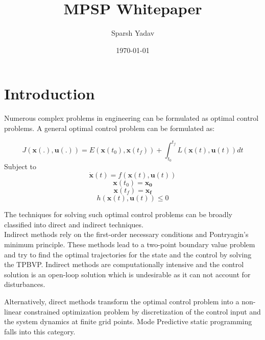 \documentclass[12pt]{article}
\title{MPSP Whitepaper}
\author{Sparsh Yadav}
\date{\today}
\begin{document}
\maketitle{}

\tableofcontents

\clearpage
\newpage

\section{Introduction}

Numerous complex problems in engineering can be formulated as optimal control problems. A general optimal control problem can be formulated as:

\begin{equation}
J(\mathbf{x}(.), \mathbf{u}(.))=E\left(\mathbf{x}\left(t_{0}\right), \mathbf{x}\left(t_{f}\right)\right)+\int_{t_{0}}^{t_{f}} L(\mathbf{x}(t), \mathbf{u}(t)) d t
\end{equation}
Subject to 
\begin{equation}
\dot{\mathbf{x}}(t)=f(\mathbf{x}(t), \mathbf{u}(t))
\end{equation}
\begin{equation}
\mathbf{x}\left(t_{0}\right)= \mathbf{x_0} 
\end{equation}
\begin{equation}
\mathbf{x}\left(t_{f}\right)= \mathbf{x_f} 
\end{equation}
\begin{equation}
h(\mathbf{x}(t), \mathbf{u}(t)) \leq 0
\end{equation}

The techniques for solving such optimal control problems can be broadly classified into direct and indirect techniques.\\

Indirect methods rely on the first-order necessary conditions and Pontryagin's minimum principle. These methods lead to a two-point boundary value problem and try to find the optimal trajectories for the state and the control by solving the TPBVP. Indirect methods are computationally intensive and the control solution is an open-loop solution which is undesirable as it can not account for disturbances.

Alternatively, direct methods transform the optimal control problem into a non-linear constrained optimization problem by discretization of the control input and the system dynamics at finite grid points. Mode Predictive static programming falls into this category.
\end{document}

